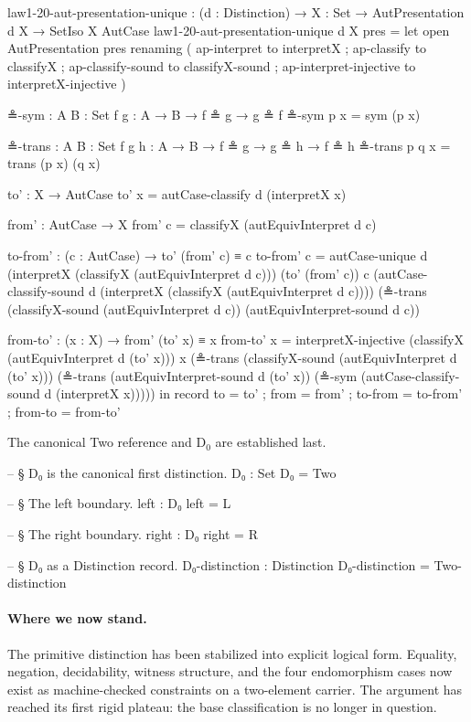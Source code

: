 \documentclass[11pt,a4paper]{book}
\begin{document}
\begin{code}
law1-20-aut-presentation-unique :
  (d : Distinction) →
  {X : Set} →
  AutPresentation d X →
  SetIso X AutCase
law1-20-aut-presentation-unique d {X} pres =
  let
    open AutPresentation pres
      renaming
        ( ap-interpret to interpretX
        ; ap-classify to classifyX
        ; ap-classify-sound to classifyX-sound
        ; ap-interpret-injective to interpretX-injective
        )

    ≗-sym : {A B : Set} {f g : A → B} → f ≗ g → g ≗ f
    ≗-sym p x = sym (p x)

    ≗-trans : {A B : Set} {f g h : A → B} → f ≗ g → g ≗ h → f ≗ h
    ≗-trans p q x = trans (p x) (q x)

    to' : X → AutCase
    to' x = autCase-classify d (interpretX x)

    from' : AutCase → X
    from' c = classifyX (autEquivInterpret d c)

    to-from' : (c : AutCase) → to' (from' c) ≡ c
    to-from' c =
      autCase-unique d (interpretX (classifyX (autEquivInterpret d c)))
        (to' (from' c))
        c
        (autCase-classify-sound d (interpretX (classifyX (autEquivInterpret d c))))
        (≗-trans
          (classifyX-sound (autEquivInterpret d c))
          (autEquivInterpret-sound d c))

    from-to' : (x : X) → from' (to' x) ≡ x
    from-to' x =
      interpretX-injective
        (classifyX (autEquivInterpret d (to' x)))
        x
        (≗-trans
          (classifyX-sound (autEquivInterpret d (to' x)))
          (≗-trans
            (autEquivInterpret-sound d (to' x))
            (≗-sym (autCase-classify-sound d (interpretX x)))))
  in
  record
    { to = to'
    ; from = from'
    ; to-from = to-from'
    ; from-to = from-to'
    }
\end{code}

The canonical Two reference and D$_0$ are established last.

\begin{code}
-- § D₀ is the canonical first distinction.
D₀ : Set
D₀ = Two

-- § The left boundary.
left : D₀
left = L

-- § The right boundary.
right : D₀
right = R

-- § D₀ as a Distinction record.
D₀-distinction : Distinction
D₀-distinction = Two-distinction
\end{code}

\paragraph{Where we now stand.}
The primitive distinction has been stabilized into explicit logical form. Equality, negation, decidability, witness structure, and the four endomorphism cases now exist as machine-checked constraints on a two-element carrier. The argument has reached its first rigid plateau: the base classification is no longer in question.
\end{document}
